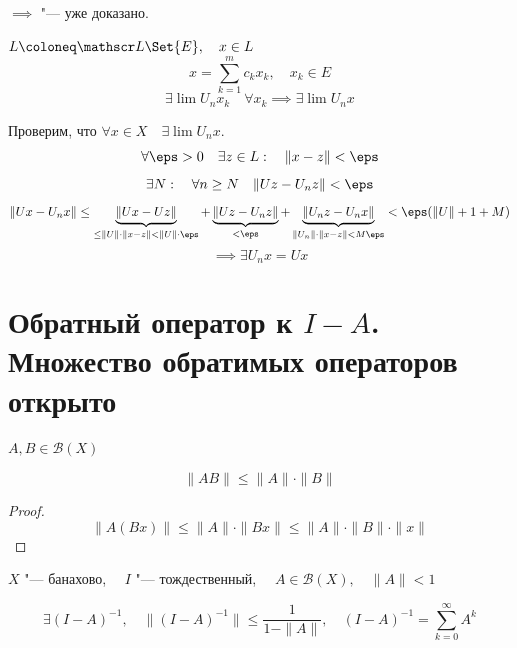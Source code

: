 \begin{iproof}
\item $ \implies $ "--- уже доказано.
\item $ L \coloneq \mathscr L\Set{E}, \quad x \in L $
	$$ x = \sum_{k = 1}^m c_k x_k, \quad x_k \in E $$
	$$ \exists \lim U_n x_k \quad \forall x_k \implies \exists \lim U_n x $$

	Проверим, что $ \forall x \in X \quad \exists \lim U_n x $.
	$$ \forall \eps > 0 \quad \exists z \in L : \quad \|x - z\| < \eps $$
	$$ \exists N : \quad \forall n \ge N \quad \|Uz - U_nz\| < \eps $$
	$$ \|Ux - U_nx\| \le \underbrace{\|Ux - Uz\|}_{\le \|U\| \cdot \|x - z\| < \|U\| \cdot \eps} +
	\underbrace{\|Uz - U_nz\|}_{< \eps} +
	\underbrace{\|U_nz - U_nx\|}_{\|U_n\| \cdot \|x - z\| < M\eps} < \eps(\|U\| + 1 + M) $$
	$$ \implies \exists U_nx = Ux $$
\end{iproof}

\section{Обратный оператор к \texorpdfstring{$ I - A $}{I - A}.
Множество обратимых операторов открыто}

\begin{statement}\label{inv:st:1}
	$ A, B \in \mathscr B(X) $

	$$ \|AB\| \le \|A\| \cdot \|B\| $$
\end{statement}

\begin{proof}
	$$ \|A(Bx)\| \le \|A\| \cdot \|Bx\| \le \|A\| \cdot \|B\| \cdot \|x\| $$
\end{proof}

\begin{theorem}
	$ X $ "--- банахово, $ \quad I $ "--- тождественный, $ \quad A \in \mathscr B(X), \quad
	\|A\| < 1 $

	$$ \exists (I - A)^{-1}, \quad \|(I - A)^{-1}\| \le \frac1{1 - \|A\|}, \quad
	(I - A)^{-1} = \sum_{k = 0}^\infty A^k $$
\end{theorem}

